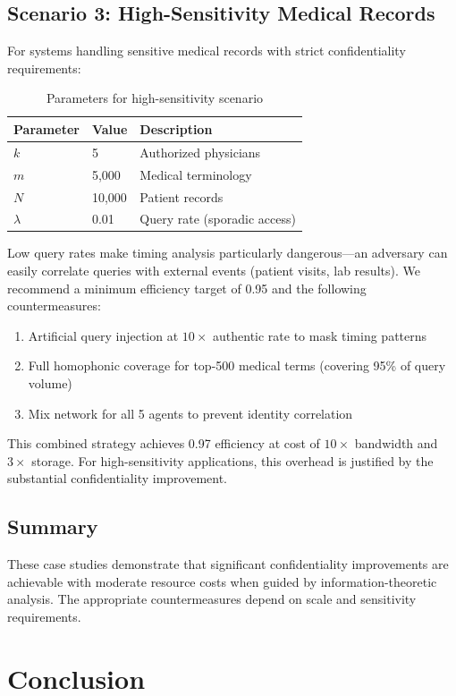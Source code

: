 \documentclass[final,11pt]{article}
\numberwithin{equation}{section}
\theoremstyle{plain}
\theoremstyle{remark}
\begin{document}
\subsection{Scenario 3: High-Sensitivity Medical Records}
For systems handling sensitive medical records with strict confidentiality requirements:

\begin{table}[h]
\centering
\caption{Parameters for high-sensitivity scenario}
\begin{tabular}{@{} l l l @{}}
\toprule
\textbf{Parameter} & \textbf{Value} & \textbf{Description}\\
\midrule
$k$ & 5 & Authorized physicians\\
$m$ & 5,000 & Medical terminology\\
$N$ & 10,000 & Patient records\\
$\lambda$ & 0.01 & Query rate (sporadic access)\\
\bottomrule
\end{tabular}
\end{table}

Low query rates make timing analysis particularly dangerous---an adversary can easily correlate queries with external events (patient visits, lab results). We recommend a minimum efficiency target of 0.95 and the following countermeasures:
\begin{enumerate}
    \item Artificial query injection at $10\times$ authentic rate to mask timing patterns
    \item Full homophonic coverage for top-500 medical terms (covering 95\% of query volume)
    \item Mix network for all 5 agents to prevent identity correlation
\end{enumerate}

This combined strategy achieves 0.97 efficiency at cost of $10\times$ bandwidth and $3\times$ storage. For high-sensitivity applications, this overhead is justified by the substantial confidentiality improvement.

\subsection{Summary}
These case studies demonstrate that significant confidentiality improvements are achievable with moderate resource costs when guided by information-theoretic analysis. The appropriate countermeasures depend on scale and sensitivity requirements.
\section{Conclusion}
\label{sec:conclusion}
\end{document}
